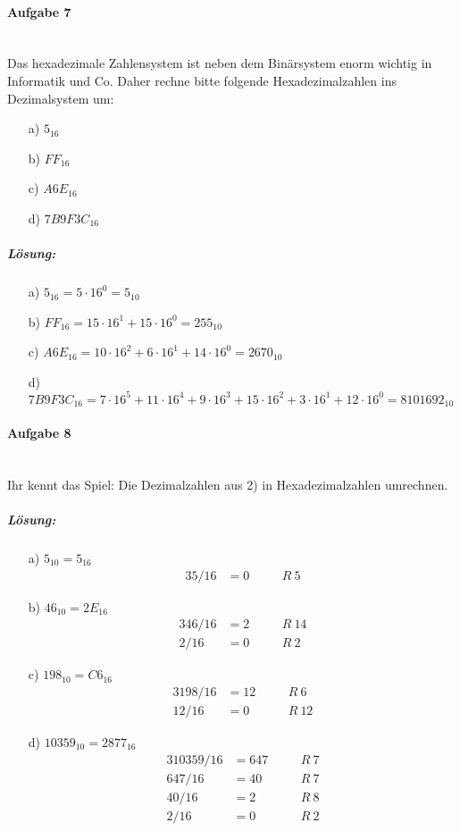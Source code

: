 \documentclass[12pt,a4paper,ngerman]{scrartcl}
\begin{document}
	\paragraph{Aufgabe 7}\mbox{}\\
	Das hexadezimale Zahlensystem ist neben dem Binärsystem enorm wichtig in Informatik und Co. Daher rechne bitte folgende Hexadezimalzahlen ins Dezimalsystem um:
	\begin{itemize}
		\item[a)] $5_{16}$
		\item[b)] $FF_{16}$
		\item[c)] $A6E_{16}$
		\item[d)] $7B9F3C_{16}$
	\end{itemize}

	\subparagraph{Lösung:} 
	\begin{itemize}
		\item[a)] $5_{16} = 5 \cdot 16^0 = 5_{10}$
		\item[b)] $FF_{16} = 15 \cdot 16^1 + 15 \cdot 16^0 = 255_{10}$
		\item[c)] $A6E_{16} = 10 \cdot 16^2 + 6 \cdot 16^1 + 14 \cdot 16^0 = 2670_{10}$
		\item[d)] $7B9F3C_{16} = 7 \cdot 16^5 + 11 \cdot 16^4 + 9 \cdot 16^3 + 15 \cdot 16^2 + 3 \cdot 16^1 + 12 \cdot 16^0 = 8101692_{10} $
	\end{itemize}

	\paragraph{Aufgabe 8}\mbox{}\\
	Ihr kennt das Spiel: Die Dezimalzahlen aus 2) in Hexadezimalzahlen umrechnen.
	
	\subparagraph{Lösung:} 
	\begin{itemize}
		\item[a)] $5_{10} = 5_{16}$
		\begin{alignat*}{3}
		5 / 16 &= 0 && \quad R\ 5
		\end{alignat*}
		
		\item[b)] $46_{10} = 2E_{16}$
		\begin{alignat*}{3}
		46 / 16 &= 2 && \quad R\ 14\\
		2 / 16 &= 0 && \quad R\ 2
		\end{alignat*}
		
		
		\item[c)] $198_{10} = C6_{16}$
		\begin{alignat*}{3}
		198 / 16 &= 12 && \quad R\ 6\\
		12 / 16 &= 0 && \quad R\ 12
		\end{alignat*}
		
		
		\item[d)] $10359_{10} = 2877_{16}$
		\begin{alignat*}{3}
		10359 / 16 &= 647 && \quad R\ 7\\
		647 / 16 &= 40 && \quad R\ 7\\
		40 / 16 &= 2 && \quad R\ 8\\
		2 / 16 &= 0 && \quad R\ 2
		\end{alignat*}
	\end{itemize}
	
\end{document}
